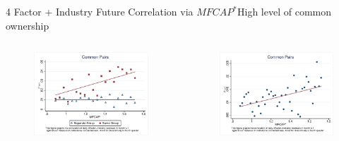 \documentclass[handout]{beamer}
\begin{document}
\begin{frame}{ 4 Factor + Industry Future  Correlation via $ MFCAP^* $}{High level of common ownership}
		\begin{columns}
				\begin{figure}
					\centering  
					\includegraphics[width=\linewidth]{"Output/Qmcorr5lrdbgsubsample.eps"}
				\end{figure}
			\begin{figure}   
				\centering
				\includegraphics[width=\linewidth]{"Output/Qmcorr5subsample.eps"}     \end{figure}            

		\end{columns}
		\centering
		
		
		
	\end{frame}
		
\end{document}
